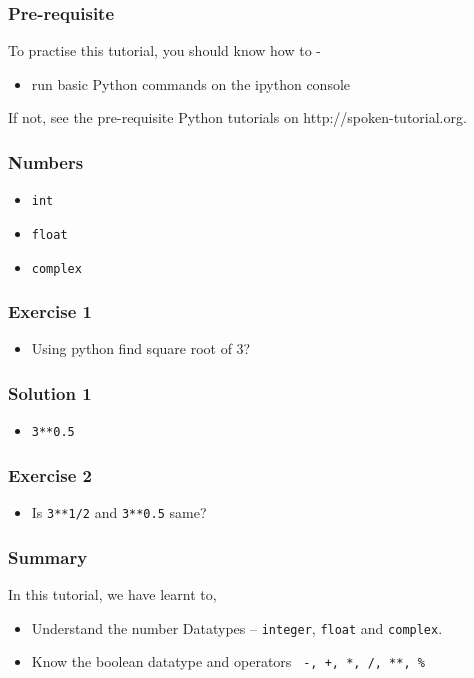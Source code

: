 \documentclass[17pt]{beamer}
\begin{document}
\begin{frame}
\frametitle{Pre-requisite}
\label{sec-3}

  To practise this tutorial, you should know how to  -\pause

\begin{itemize}
\item run basic Python commands on the ipython console
\end{itemize}
If not, see the pre-requisite Python tutorials on {\color{blue}http://spoken-tutorial.org}.
\end{frame}
\begin{frame}
\frametitle{Numbers}
\label{sec-3}


\begin{itemize}
\item \texttt{int}
\item \texttt{float}
\item \texttt{complex}
\end{itemize}
\end{frame}
\begin{frame}
\frametitle{Exercise 1}
\label{sec-7}

\begin{itemize}
\item Using python find square root of 3?
\end{itemize}
\end{frame}

\begin{frame}
\frametitle{Solution 1}
\label{sec-8}

\begin{itemize}
\item \texttt{3**0.5}
\end{itemize}
\end{frame}

\begin{frame}
\frametitle{Exercise 2}
\label{sec-9}

\begin{itemize}
\item Is \texttt{3**1/2} and \texttt{3**0.5} same?
\end{itemize}
\end{frame}

\begin{frame}
\frametitle{Summary}
\label{sec-13.1}

  In this tutorial, we have learnt to,

\begin{itemize}
\item Understand the number Datatypes -- \texttt{integer}, \texttt{float} and \texttt{complex}.\pause
\item Know the boolean datatype and operators  \texttt{ -, +, *, /, **, \%} 
\end{itemize}
\end{frame}
\end{document}
